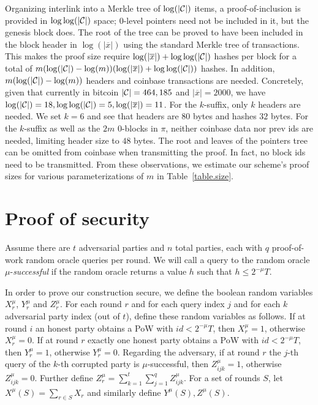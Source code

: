 Organizing interlink into a Merkle tree of $\log(|\mathcal{C}|)$ items, a
proof-of-inclusion is provided in $\log \log(|\mathcal{C}|)$ space; $0$-level
pointers need not be included in it, but the genesis block does. The root of the
tree can be proved to have been included in the block header in $\log(|\overline
x|)$ using the standard Merkle tree of transactions. This makes the proof size
require $\log(|\overline x|) + \log\log(|\mathcal{C}|)$ hashes per block for a total
of $m (\log(|\mathcal{C}|) - \log(m))(\log(|\overline x|) + \log\log(|\mathcal{C}|))$
hashes. In addition, $m (\log(|\mathcal{C}|) - \log(m))$ headers and coinbase
transactions are needed. Concretely, given that currently in bitcoin $|\mathcal{C}| =
464,185$ and $|\overline x| = 2000$, we have $\log(|\mathcal{C}|) = 18,
\log\log(|\mathcal{C}|) = 5, \log(|\overline x|) = 11$. For the $k$-suffix, only $k$
headers are needed. We set $k = 6$ and see that headers are $80$ bytes and
hashes $32$ bytes. For the $k$-suffix as well as the $2m$ $0$-blocks in $\pi$,
neither coinbase data nor prev ids are needed, limiting header size to $48$
bytes. The root and leaves of the pointers tree can be omitted from coinbase when
transmitting the proof. In fact, no block ids need to be transmitted. From these
observations, we estimate our scheme's proof sizes for various parameterizations
of $m$ in Table~\ref{table.size}.

\section{Proof of security}
Assume there are $t$ adversarial parties and $n$ total parties, each with $q$
proof-of-work random oracle queries per round. We will call a query to the
random oracle $\mu$-\textit{successful} if the random oracle returns a value $h$
such that $h \leq 2^{-\mu}T$.

In order to prove our construction secure, we define the boolean random
variables $X_r^\mu$, $Y_r^\mu$ and $Z_r^\mu$. For each round $r$ and for each
query index $j$ and for each $k$ adversarial party index (out of $t$), define
these random variables as follows. If at round $i$ an honest party obtains a
PoW with $id < 2^{-\mu}T$, then $X_r^\mu = 1$, otherwise $X_r^\mu = 0$. If at
round $r$ exactly one honest party obtains a PoW with $id < 2^{-\mu}T$, then
$Y_r^\mu = 1$, otherwise $Y_r^\mu = 0$. Regarding the adversary, if at round $r$
the $j$-th query of the $k$-th corrupted party is $\mu$-successful, then
$Z^\mu_{ijk} = 1$, otherwise $Z^\mu_{ijk} = 0$. Further define $Z^\mu_r =
\sum_{k=1}^t \sum_{j=1}^q Z^\mu_{ijk}$. For a set of rounds $S$, let $X^\mu(S) =
\sum_{r \in S} X_r$ and similarly define $Y^\mu(S), Z^\mu(S)$.

